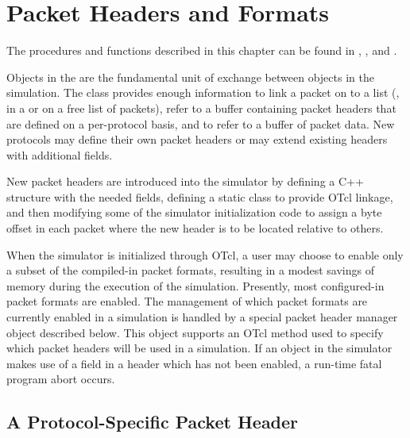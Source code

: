 \chapter{Packet Headers and Formats}
\label{chap:pformat}

The procedures and functions described in this chapter can be found in
,
, and .

Objects in the  are the fundamental unit of
exchange between objects in the simulation.
The class 
provides enough information to link a packet on to a list
(\ie, in a  or on a free list of packets),
refer to a buffer containing packet headers
that are defined on a per-protocol basis,
and to refer to a buffer of packet data.
New protocols may define their own packet headers or may extend
existing headers with additional fields.

New packet headers are introduced into the simulator
by defining a C++ structure with the needed fields,
defining a static class to provide OTcl linkage,
and then modifying some of the simulator initialization code
to assign a byte offset in each packet where the new header
is to be located relative to others.

When the simulator is initialized through OTcl,
a user may choose to enable
only a subset of the compiled-in packet formats, resulting in
a modest savings of memory during the execution of the simulation.
Presently, most configured-in packet formats are enabled.
The management of which packet formats are currently enabled
in a simulation is handled by a special packet header manager
object described below.
This object supports an OTcl method used to specify
which packet headers will be used in a simulation.
If an object in the simulator makes use of a field in a header
which has not been enabled, a run-time fatal program abort occurs.

\section{A Protocol-Specific Packet Header}
\label{sec:ppackethdr}

